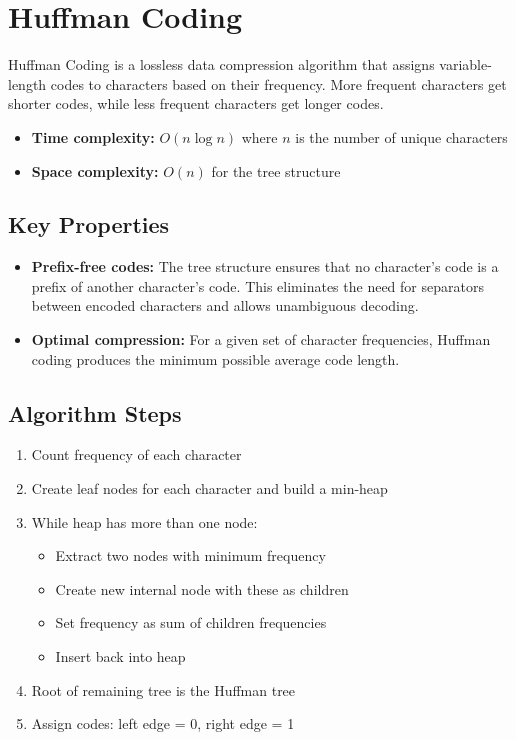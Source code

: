 \documentclass[12pt]{article}
\begin{document}
\section{Huffman Coding}

Huffman Coding is a lossless data compression algorithm that assigns variable-length codes to characters based on their frequency. More frequent characters get shorter codes, while less frequent characters get longer codes.

\begin{itemize}
    \item \textbf{Time complexity:} $O(n \log n)$ where $n$ is the number of unique characters
    \item \textbf{Space complexity:} $O(n)$ for the tree structure
\end{itemize}

\subsection{Key Properties}
\begin{itemize}
    \item \textbf{Prefix-free codes:} The tree structure ensures that no character's code is a prefix of another character's code. This eliminates the need for separators between encoded characters and allows unambiguous decoding.
    \item \textbf{Optimal compression:} For a given set of character frequencies, Huffman coding produces the minimum possible average code length.
\end{itemize}

\subsection{Algorithm Steps}
\begin{enumerate}
    \item Count frequency of each character
    \item Create leaf nodes for each character and build a min-heap
    \item While heap has more than one node:
    \begin{itemize}
        \item Extract two nodes with minimum frequency
        \item Create new internal node with these as children
        \item Set frequency as sum of children frequencies
        \item Insert back into heap
    \end{itemize}
    \item Root of remaining tree is the Huffman tree
    \item Assign codes: left edge = 0, right edge = 1
\end{enumerate}
\end{document}
